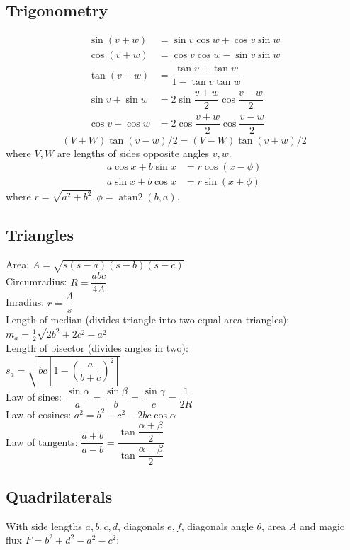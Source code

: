 \documentclass[letterpaper,landscape]{article}
\begin{document}
\begin{multicols*}{3}
    \subsection{Trigonometry}
    \begin{align*}
    \sin(v+w)&{}=\sin v\cos w+\cos v\sin w\\
    \cos(v+w)&{}=\cos v\cos w-\sin v\sin w\\
    \tan(v+w)&{}=\dfrac{\tan v+\tan w}{1-\tan v\tan w}\\
    \sin v+\sin w&{}=2\sin\dfrac{v+w}{2}\cos\dfrac{v-w}{2}\\
    \cos v+\cos w&{}=2\cos\dfrac{v+w}{2}\cos\dfrac{v-w}{2}
    \end{align*}
    \[ (V+W)\tan(v-w)/2{}=(V-W)\tan(v+w)/2 \]
    where $V, W$ are lengths of sides opposite angles $v, w$.
    \begin{align*}
    	a\cos x+b\sin x&=r\cos(x-\phi)\\
    	a\sin x+b\cos x&=r\sin(x+\phi)
    \end{align*}
    where $r=\sqrt{a^2+b^2}, \phi=\operatorname{atan2}(b,a)$.
    
    \subsection{Triangles}
    Area: $A=\sqrt{s(s-a)(s-b)(s-c)}$\\
    Circumradius: $R=\dfrac{abc}{4A}$\\
    Inradius: $r=\dfrac{A}{s}$\\
    Length of median (divides triangle into two equal-area triangles): $m_a=\tfrac{1}{2}\sqrt{2b^2+2c^2-a^2}$\\
    Length of bisector (divides angles in two):\\ $s_a=\sqrt{bc\left[1-\left(\dfrac{a}{b+c}\right)^2\right]}$\\
    Law of sines: $\dfrac{\sin\alpha}{a}=\dfrac{\sin\beta}{b}=\dfrac{\sin\gamma}{c}=\dfrac{1}{2R}$\\
    Law of cosines: $a^2=b^2+c^2-2bc\cos\alpha$\\
    Law of tangents: $\dfrac{a+b}{a-b}=\dfrac{\tan\dfrac{\alpha+\beta}{2}}{\tan\dfrac{\alpha-\beta}{2}}$
    
    \subsection{Quadrilaterals}
    With side lengths $a,b,c,d$, diagonals $e, f$, diagonals angle $\theta$, area $A$ and
magic flux $F=b^2+d^2-a^2-c^2$:


\end{multicols*}
\end{document}
